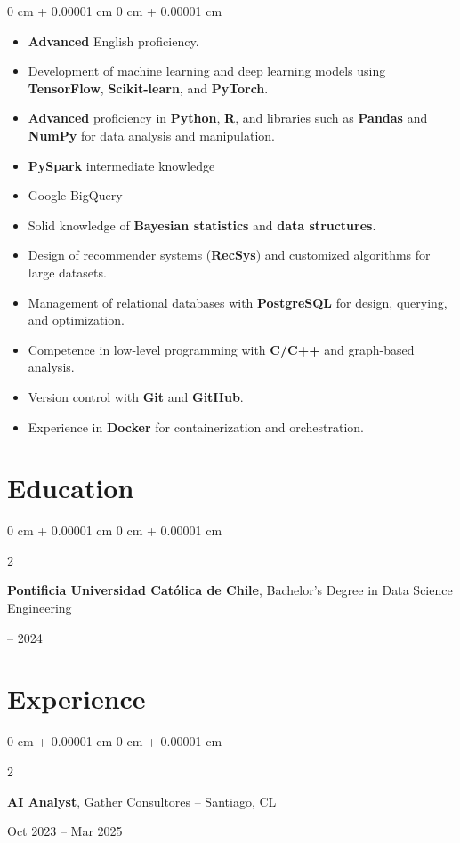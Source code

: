 \documentclass[10pt, letterpaper]{article}
\newenvironment{highlightsforbulletentries}{
    \begin{itemize}[
        topsep=0.10 cm,
        parsep=0.10 cm,
        partopsep=0pt,
        itemsep=0pt,
        leftmargin=10pt
    ]
}{
    \end{itemize}
} %
\newenvironment{onecolentry}{
    \begin{adjustwidth}{
        0 cm + 0.00001 cm
    }{
        0 cm + 0.00001 cm
    }
}{
    \end{adjustwidth}
} %
\newenvironment{twocolentry}[2][]{
    \onecolentry
    \def\secondColumn{#2}
    \setcolumnwidth{\fill, 4.5 cm}
    \begin{paracol}{2}
}{
    \switchcolumn \raggedleft \secondColumn
    \end{paracol}
    \endonecolentry
} %
\begin{document}
\begin{onecolentry}
    \begin{highlightsforbulletentries}

\begin{itemize}
    \item \textbf{Advanced} English proficiency.
    \item Development of machine learning and deep learning models using \textbf{TensorFlow}, \textbf{Scikit-learn}, and \textbf{PyTorch}.
    \item \textbf{Advanced} proficiency in \textbf{Python}, \textbf{R}, and libraries such as \textbf{Pandas} and \textbf{NumPy} for data analysis and manipulation.
    \item \textbf{PySpark} intermediate knowledge 
    \item Google BigQuery
    \item Solid knowledge of \textbf{Bayesian statistics} and \textbf{data structures}.
    \item Design of recommender systems (\textbf{RecSys}) and customized algorithms for large datasets.
    \item Management of relational databases with \textbf{PostgreSQL} for design, querying, and optimization.
    \item Competence in low-level programming with \textbf{C/C++} and graph-based analysis.
    \item Version control with \textbf{Git} and \textbf{GitHub}.
    \item Experience in \textbf{Docker} for containerization and orchestration.
\end{itemize}
    \end{highlightsforbulletentries}
\end{onecolentry}

\section{Education}

\begin{twocolentry}{
    2021 – 2024
}
    \textbf{Pontificia Universidad Católica de Chile}, Bachelor's Degree in Data Science Engineering
\end{twocolentry}

\section{Experience}

\begin{twocolentry}{Oct 2023 – Mar 2025}
    \textbf{AI Analyst}, Gather Consultores -- Santiago, CL
\end{twocolentry}
\end{document}
